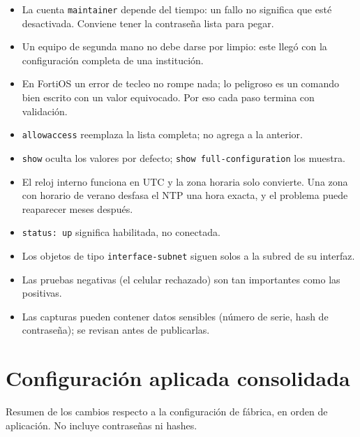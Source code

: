 \documentclass[11pt,a4paper]{article}
\begin{document}
\begin{itemize}
  \item La cuenta \texttt{maintainer} depende del tiempo: un fallo no significa que esté desactivada. Conviene tener la contraseña lista para pegar.
  \item Un equipo de segunda mano no debe darse por limpio: este llegó con la configuración completa de una institución.
  \item En FortiOS un error de tecleo no rompe nada; lo peligroso es un comando bien escrito con un valor equivocado. Por eso cada paso termina con validación.
  \item \texttt{allowaccess} reemplaza la lista completa; no agrega a la anterior.
  \item \texttt{show} oculta los valores por defecto; \texttt{show full-configuration} los muestra.
  \item El reloj interno funciona en UTC y la zona horaria solo convierte. Una zona con horario de verano desfasa el NTP una hora exacta, y el problema puede reaparecer meses después.
  \item \texttt{status: up} significa habilitada, no conectada.
  \item Los objetos de tipo \texttt{interface-subnet} siguen solos a la subred de su interfaz.
  \item Las pruebas negativas (el celular rechazado) son tan importantes como las positivas.
  \item Las capturas pueden contener datos sensibles (número de serie, hash de contraseña); se revisan antes de publicarlas.
\end{itemize}

\appendix
\section{Configuración aplicada consolidada}

Resumen de los cambios respecto a la configuración de fábrica, en orden de aplicación. No incluye contraseñas ni hashes.
\end{document}
